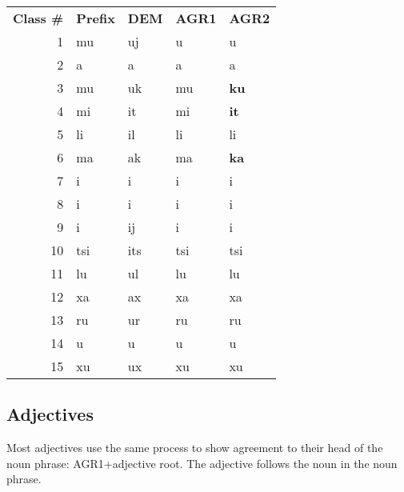 \small
\begin{tabular}{rllll}
\addlinespace
\toprule
\multicolumn{ 5}{c}{{\bf Agreement Marker Chart}} \\
\midrule
{\bf Class \# } & {\bf  Prefix } & {\bf  DEM } & {\bf  AGR1 } & {\bf  AGR2 } \\
\midrule
1     &  mu   &  uj   &  u    &  u \\
2     &  \beta{}a  &  a\beta{}  &  \beta{}a  &  \beta{}a \\
3     &  mu   &  uk   &  mu   &  \bf{ku}  \\
4     &  mi   &  it\esh{}  &  mi   &  \bf{it\esh{}}  \\
5     &  li   &  il   &  li   &  li \\
6     &  ma   &  ak   &  ma   &  \bf{ka}  \\
7     &  \esh{}i  &  i\esh{}  &  \esh{}i  &  \esh{}i  \\
8     &  \beta{}i  &  i\beta{}  &  \beta{}i  &  \beta{}i  \\
9     &  i    &  ij   &  i    &  i  \\
10    &  tsi  &  its  &  tsi  &  tsi \\
11    &  lu   &  ul   &  lu   &  lu \\
12    &  xa   &  ax   &  xa   &  xa \\
13    &  ru   &  ur   &  ru   &  ru \\
14    &  \beta{}u  &  u\beta{}  &  \beta{}u  &  \beta{}u \\
15    &  xu   &  ux   &  xu   &  xu \\
\bottomrule
\end{tabular}
\normalsize

\subsection{Adjectives}
Most adjectives use the same process to show agreement to their head of the noun phrase: AGR1+adjective root.  The adjective follows the noun in the noun phrase.

